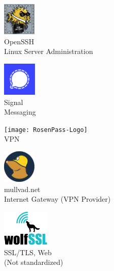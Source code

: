 \begin{frame}[T]{}

\centering

\vspace{0.5em}
\begin{minipage}{.4\textwidth}
  \centering
  \includegraphics[width=4.3em]{graphics/logos/OpenSSH_logo.png}
  \\ OpenSSH
  \\ Linux Server Administration
\end{minipage}
\begin{minipage}{.4\textwidth}
  \centering
  \vspace{0.1em}
  \includegraphics[width=4.35em]{graphics/logos/Signal-Logo-White_on_Ultramarine_(2024).svg}
  \\ Signal
  \\ Messaging
\end{minipage}

\vspace{1.0em}
\begin{minipage}{.4\textwidth}
  \centering
  \texttt{[image: RosenPass-Logo]}
  \\ VPN
\end{minipage}
\vspace{-2.2em}

\begin{minipage}{.4\textwidth}
  \centering
  \includegraphics[width=4.3em]{graphics/logos/mullvad.svg}
  \\ mullvad.net
  \\ Internet Gateway (VPN Provider)
\end{minipage}
\begin{minipage}{.4\textwidth}
  \centering
  \vspace{-1em}
  \includegraphics[width=6.1em]{graphics/logos/wolfssl_logo_300px.png}
  \\ SSL/TLS, Web
  \\ (Not standardized)
\end{minipage}

\end{frame}
